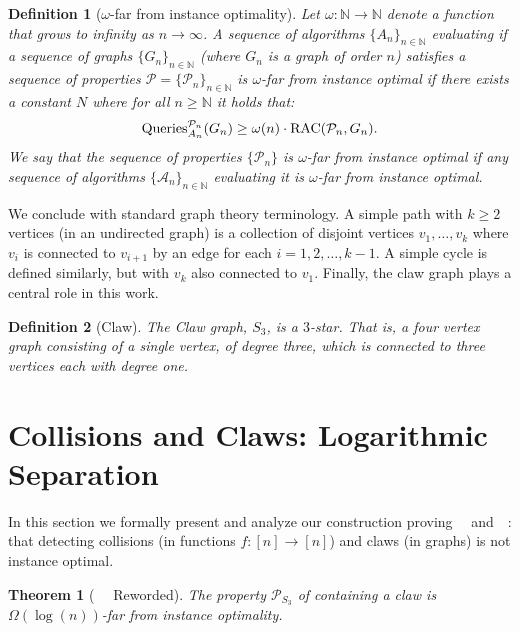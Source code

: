 \documentclass[11pt]{article}
\numberwithin{equation}{section}
\newtheorem{theorem}{Theorem}[section]
\newtheorem{definition}[definition]{Definition}
\newcommand{\Query}{\text{Queries}}
\newcommand{\N}{\mathbb N}
\renewcommand{\P}{\mathcal{P}}
\newcommand{\kstar}[1]{\ensuremath{#1}-star}
\newcommand{\1}{\mathbf{1}}
\newcommand{\A}{\mathcal A}
\begin{document}
\begin{definition}[$\omega$-far from instance optimality]
Let $\omega\colon \N \to \N$ denote a function that grows to infinity as $n \to \infty$.
A sequence of algorithms $\{A_n\}_{n \in \N}$ evaluating if a sequence of graphs $\{G_n\}_{n \in \N}$ (where $G_n$ is a graph of order $n$) satisfies a sequence of properties $\P = \{\P_n\}_{n \in \N}$ is \emph{$\omega$-far from instance optimal} if there exists a constant $N$ where for all $n \ge \N$ it holds that:
  \begin{align*}
   \Query^{\P_n}_{A_n}(G_n) \ge \omega(n) \cdot \RACC(\P_n,G_n).
  \end{align*}
  We say that the sequence of properties $\{\P_n\}$ is \emph{$\omega$-far from instance optimal} if any sequence of algorithms $\{\A_n\}_{n \in \N}$ evaluating it is $\omega$-far from instance optimal.
\end{definition}

We conclude with standard graph theory terminology. A simple path with $k \geq 2$ vertices (in an undirected graph) is a collection of disjoint vertices $v_1, \ldots, v_k$ where $v_i$ is connected to $v_{i+1}$ by an edge for each $i=1,2,\ldots,k-1$. A simple cycle is defined similarly, but with $v_k$ also connected to $v_1$. 
Finally, the claw graph plays a central role in this work.
\begin{definition}[Claw]
The \emph{Claw graph}, $S_3$, is a \kstar{3}. That is, a four vertex graph consisting of a single vertex, of degree three, which is connected to three vertices each with degree one.
\end{definition} 
\section{Collisions and Claws: Logarithmic Separation} \label{sec:3}



In this section we formally present and analyze our construction proving~~ and~~: that detecting collisions (in functions $f\colon [n] \to [n]$) and claws (in graphs) is not instance optimal. 

\begin{theorem}[~~ Reworded]
The property $\P_{S_3}$ of containing a claw is $\Omega(\log(n))$-far from instance optimality.

\end{theorem}
\end{document}
